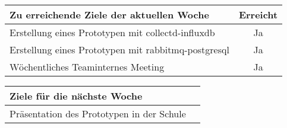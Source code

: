 \begin{tabularx}{\textwidth}{Xc}
    \arrayrulecolor{OliveGreen}
    \toprule
    {\bfseries Zu erreichende Ziele der aktuellen Woche} & {\bfseries Erreicht} \\
    \midrule[2pt]
    Erstellung eines Prototypen mit collectd-influxdb    &Ja                    \\
    \rowcolor{OliveGreen!15}
    Erstellung eines Prototypen mit rabbitmq-postgresql  &Ja                    \\
    \rowcolor{White}
    Wöchentliches Teaminternes Meeting                   &Ja                    \\
    \bottomrule[2pt]
\end{tabularx}
%
\vspace{1cm}
%
\begin{tabularx}{\textwidth}{Xc}
    \arrayrulecolor{OliveGreen}
    \toprule
    {\bfseries Ziele für die nächste Woche}              &                      \\
    \midrule[2pt]
    Präsentation des Prototypen in der Schule            &                      \\
\end{tabularx}
